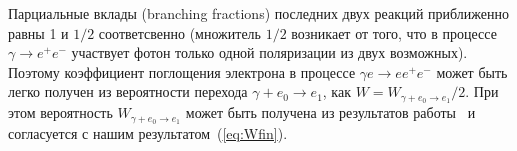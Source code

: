 Парциальные вклады (branching fractions) последних двух 
реакций приближенно равны 1 и $1/2$ соответсвенно 
(множитель $1/2$ возникает от того, 
что в процессе $\gamma \to e^+e^-$ участвует фотон только одной поляризации из двух возможных). 
Поэтому коэффициент поглощения электрона в  процессе  
$\gamma e \to e e^+e^-$ может быть легко получен из 
вероятности перехода $\gamma + e_0  \to e_1$, как $W = W_{\gamma + e_0 \to e_1}/2$. 
При этом вероятность $W_{\gamma + e_0 \to e_1}$ может быть получена из результатов 
работы~\cite{Latal:1986} и согласуется с нашим результатом~(\ref{eq:Wfin}).
 
 